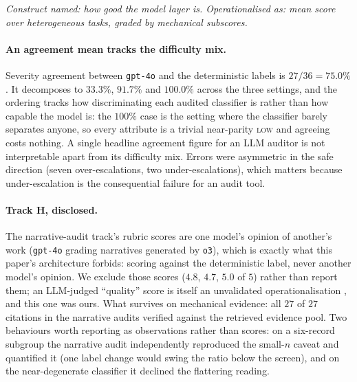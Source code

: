 \documentclass[sigconf,nonacm]{acmart}
\begin{document}
\emph{Construct named: how good the model layer is. Operationalised as: mean
score over heterogeneous tasks, graded by mechanical subscores.}

\paragraph{An agreement mean tracks the difficulty mix.} Severity agreement
between \texttt{gpt-4o} and the deterministic labels is $27/36 = 75.0\%$. It
decomposes to $33.3\%$, $91.7\%$ and $100.0\%$ across the three settings, and
the ordering tracks how discriminating each audited classifier is rather than
how capable the model is: the $100\%$ case is the setting where the classifier
barely separates anyone, so every attribute is a trivial near-parity
\textsc{low} and agreeing costs nothing. A single headline agreement figure
for an LLM auditor is not interpretable apart from its difficulty mix. Errors were asymmetric in the safe
direction (seven over-escalations, two under-escalations), which matters
because under-escalation is the consequential failure for an audit tool.

\paragraph{Track H, disclosed.} The narrative-audit track's rubric scores are
one model's opinion of another's work (\texttt{gpt-4o} grading narratives
generated by \texttt{o3}), which is exactly what this paper's architecture
forbids: scoring against the deterministic label, never another model's
opinion. We exclude those scores ($4.8$, $4.7$, $5.0$ of $5$) rather than
report them; an LLM-judged ``quality'' score is itself an unvalidated
operationalisation \citep{zheng2023}, and this one was ours. What survives on
mechanical evidence: all $27$ of $27$ citations in the narrative audits
verified against the retrieved evidence pool. Two behaviours worth reporting
as observations rather than scores: on a six-record subgroup the narrative
audit independently reproduced the small-$n$ caveat and quantified it (one
label change would swing the ratio below the screen), and on the
near-degenerate classifier it declined the flattering reading.
\end{document}
